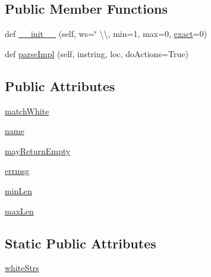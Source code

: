 \subsection*{Public Member Functions}
\begin{DoxyCompactItemize}
\item 
def \hyperlink{classsetuptools_1_1__vendor_1_1pyparsing_1_1White_ab4c953a9e93bac4a6e1808fd34aa3957}{\+\_\+\+\_\+init\+\_\+\+\_\+} (self, ws=\char`\"{} \textbackslash{}\textbackslash{}, min=1, max=0, \hyperlink{namespacesetuptools_1_1__vendor_1_1pyparsing_a4cac4dd1a3d815bb71fdb1334d94a010}{exact}=0)
\item 
def \hyperlink{classsetuptools_1_1__vendor_1_1pyparsing_1_1White_a1051ad5867aaeb8cf7a164f73819cfe0}{parse\+Impl} (self, instring, loc, do\+Actions=True)
\end{DoxyCompactItemize}
\subsection*{Public Attributes}
\begin{DoxyCompactItemize}
\item 
\hyperlink{classsetuptools_1_1__vendor_1_1pyparsing_1_1White_a33a16c4f391cc1d6d487ad4c2a218cd8}{match\+White}
\item 
\hyperlink{classsetuptools_1_1__vendor_1_1pyparsing_1_1White_a6c7eb248e66fdaa41b7c579d4c17b723}{name}
\item 
\hyperlink{classsetuptools_1_1__vendor_1_1pyparsing_1_1White_ad3557fae3b42c92fd87d31a285807949}{may\+Return\+Empty}
\item 
\hyperlink{classsetuptools_1_1__vendor_1_1pyparsing_1_1White_a122cbc023457334667b7c1ca5c9144af}{errmsg}
\item 
\hyperlink{classsetuptools_1_1__vendor_1_1pyparsing_1_1White_ae4039efae5150414812019c3a13c5b04}{min\+Len}
\item 
\hyperlink{classsetuptools_1_1__vendor_1_1pyparsing_1_1White_ac0dd6bda9bd4f96789e1b655a8f3c760}{max\+Len}
\end{DoxyCompactItemize}
\subsection*{Static Public Attributes}
\begin{DoxyCompactItemize}
\item 
\hyperlink{classsetuptools_1_1__vendor_1_1pyparsing_1_1White_ab361428dfa41bf45f7f24c481a9015c2}{white\+Strs}
\end{DoxyCompactItemize}
